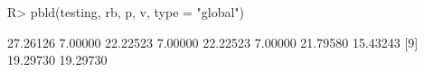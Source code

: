 \begin{Schunk}
% --begin: "pbld6"
\begin{Sinput}
R> pbld(testing, rb, p, v, type = "global")
\end{Sinput}
\begin{Soutput}
 [1] 27.26126  7.00000 22.22523  7.00000 22.22523  7.00000 21.79580 15.43243
 [9] 19.29730 19.29730
\end{Soutput}
%
% --end: "pbld6"
\end{Schunk}
